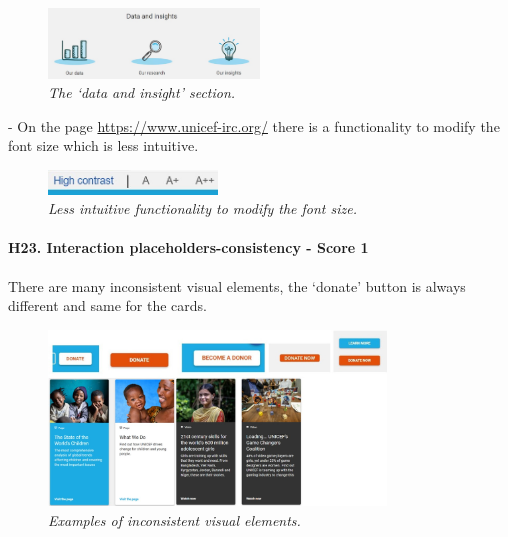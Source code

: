 \begin{figure}[!h]
	\begin{center}
		\includegraphics[width=0.5\textwidth]{FinalScores25.jpg}
		\captionsetup{font=small}
		\caption{\textit{The ‘data and insight’ section.}}
	\end{center}
\end{figure}
\newline -	On the page \href{https://www.unicef-irc.org/}{https://www.unicef-irc.org/} there is a functionality to modify the font size which is less intuitive.
\begin{figure}[!h]
	\begin{center}
		\includegraphics[width=0.4\textwidth]{FinalScores26.jpg}
		\captionsetup{font=small}
		\caption{\textit{Less intuitive functionality to modify the font size.}}
	\end{center}
\end{figure}
\newline
\newline \paragraph{H23. Interaction placeholders-consistency - Score 1}	There are many inconsistent visual elements, the ‘donate’ button is always different and same for the cards.
\begin{figure}[!h]
	\begin{center}
		\includegraphics[width=0.8\textwidth]{FinalScores27.jpg}
		\captionsetup{font=small}
		\caption{\textit{Examples of inconsistent visual elements.}}
	\end{center}
\end{figure}
